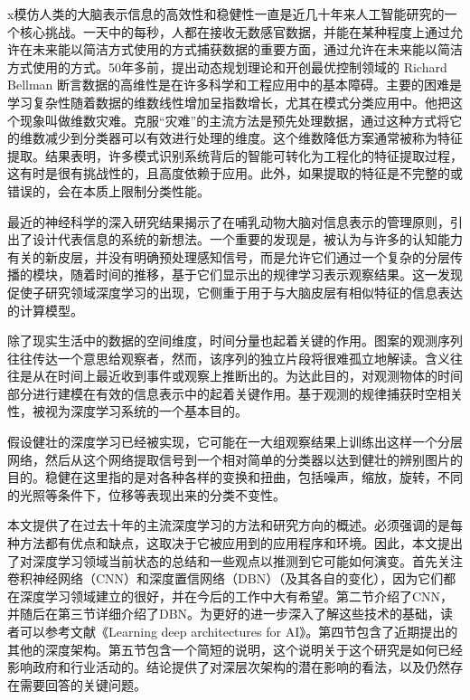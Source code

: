 
\appendix

%
x模仿人类的大脑表示信息的高效性和稳健性一直是近几十年来人工智能研究的一个核心挑战。一天中的每秒，人都在接收无数感官数据，并能在某种程度上通过允许在未来能以简洁方式使用的方式捕获数据的重要方面，通过允许在未来能以简洁方式使用的方式。50年多前，提出动态规划理论和开创最优控制领域的 Richard Bellman 断言数据的高维性是在许多科学和工程应用中的基本障碍。主要的困难是学习复杂性随着数据的维数线性增加呈指数增长，尤其在模式分类应用中。他把这个现象叫做维数灾难。克服“灾难”的主流方法是预先处理数据，通过这种方式将它的维数减少到分类器可以有效进行处理的维度。这个维数降低方案通常被称为特征提取。结果表明，许多模式识别系统背后的智能可转化为工程化的特征提取过程，这有时是很有挑战性的，且高度依赖于应用。此外，如果提取的特征是不完整的或错误的，会在本质上限制分类性能。

最近的神经科学的深入研究结果揭示了在哺乳动物大脑对信息表示的管理原则，引出了设计代表信息的系统的新想法。一个重要的发现是，被认为与许多的认知能力有关的新皮层，并没有明确预处理感知信号，而是允许它们通过一个复杂的分层传播的模块，随着时间的推移，基于它们显示出的规律学习表示观察结果。这一发现促使子研究领域深度学习的出现，它侧重于用于与大脑皮层有相似特征的信息表达的计算模型。

除了现实生活中的数据的空间维度，时间分量也起着关键的作用。图案的观测序列往往传达一个意思给观察者，然而，该序列的独立片段将很难孤立地解读。含义往往是从在时间上最近收到事件或观察上推断出的。为达此目的，对观测物体的时间部分进行建模在有效的信息表示中的起着关键作用。基于观测的规律捕获时空相关性，被视为深度学习系统的一个基本目的。

假设健壮的深度学习已经被实现，它可能在一大组观察结果上训练出这样一个分层网络，然后从这个网络提取信号到一个相对简单的分类器以达到健壮的辨别图片的目的。稳健在这里指的是对各种各样的变换和扭曲，包括噪声，缩放，旋转，不同的光照等条件下，位移等表现出来的分类不变性。

本文提供了在过去十年的主流深度学习的方法和研究方向的概述。必须强调的是每种方法都有优点和缺点，这取决于它被应用到的应用程序和环境。因此，本文提出了对深度学习领域当前状态的总结和一些观点以推测到它可能如何演变。首先关注卷积神经网络（CNN）和深度置信网络（DBN）（及其各自的变化），因为它们都在深度学习领域建立的很好，并在今后的工作中大有希望。第二节介绍了CNN，并随后在第三节详细介绍了DBN。为更好的进一步深入了解这些技术的基础，读者可以参考文献《Learning deep architectures for AI》。第四节包含了近期提出的其他的深度架构。第五节包含一个简短的说明，这个说明关于这个研究是如何已经影响政府和行业活动的。结论提供了对深层次架构的潜在影响的看法，以及仍然存在需要回答的关键问题。

